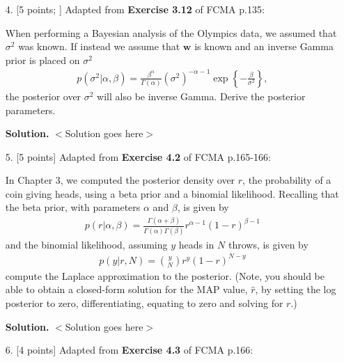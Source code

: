 \documentclass[10pt]{article}
\begin{document}
\begin{itemize}
{\bf Solution.} $<$Solution goes here$>$



\item[4.]  [5 points; \boldred{Required only for Graduates}]
Adapted from {\bf Exercise 3.12} of FCMA p.135:

When performing a Bayesian analysis of the Olympics data, we assumed that $\sigma^2$ was known.  If instead we assume that $\mathbf{w}$ is known and an inverse Gamma prior is placed on $\sigma^2$
\begin{eqnarray*}
p(\sigma^2 | \alpha, \beta) = \frac{\beta^{\alpha}}{\Gamma(\alpha)} (\sigma^2)^{-\alpha-1} \exp \left\{-\frac{\beta}{\sigma^2} \right\},
\end{eqnarray*}
the posterior over $\sigma^2$ will also be inverse Gamma.  Derive the posterior parameters.  

{\bf Solution.} $<$Solution goes here$>$



\item[5.]  [5 points]
Adapted from {\bf Exercise 4.2} of FCMA p.165-166:

In Chapter 3, we computed the posterior density over $r$, the probability of a coin giving heads, using a beta prior and a binomial likelihood.  Recalling that the beta prior, with parameters $\alpha$ and $\beta$, is given by
\begin{eqnarray*}
p(r | \alpha, \beta) = \frac{\Gamma(\alpha + \beta)}{\Gamma(\alpha) \Gamma(\beta)} r^{\alpha - 1} (1 - r)^{\beta - 1}
\end{eqnarray*}
and the binomial likelihood, assuming $y$ heads in $N$ throws, is given by
\begin{eqnarray*}
p(y | r, N) = {y \choose N} r^{y} (1 - r)^{N-y}
\end{eqnarray*}
compute the Laplace approximation to the posterior.  (Note, you should be able to obtain a closed-form solution for the MAP value, $\hat{r}$, by setting the log posterior to zero, differentiating, equating to zero and solving for $r$.)

{\bf Solution.} $<$Solution goes here$>$



\item[6.]  [4 points]
Adapted from {\bf Exercise 4.3} of FCMA p.166:


\end{itemize}
\end{document}
